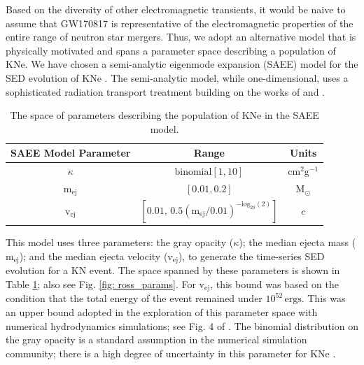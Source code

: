 Based on the diversity of other electromagnetic transients, it would be naive to assume that GW170817 is representative of the electromagnetic properties of the entire range of neutron star mergers. Thus, we adopt an alternative model that is physically motivated and spans a parameter space describing a population of KNe. We have chosen a semi-analytic eigenmode expansion (SAEE) model for the SED evolution of KNe \citep{Rosswog2018}. The semi-analytic model, while one-dimensional, uses a sophisticated radiation transport treatment building on the works of \citet{Wollaeger2017} and \citet{Pinto2000}.

\begin{table}[hb!]
  \centering
  \begin{tabular}{c|c|c}
    SAEE Model Parameter & Range & Units \\
    \hline
    $\kappa$ & $\mathrm{binomial}[1, 10]$ & $\mathrm{cm^2 g^{-1}}$ \\
    \hline
    $\mathrm{m_{ej}}$ & $[0.01, 0.2]$ & $\mathrm{M_{\odot}}$ \\
    \hline
    $\mathrm{v_{ej}}$ & $[0.01, \, 0.5 (\mathrm{m_{ej}}/0.01)^{-\mathrm{log}_{20}(2)}]$ & $c$
  \end{tabular}
  \caption{The space of parameters describing the population of KNe in the SAEE model.}
  \label{tab: ross_params}
\end{table}

This model uses three parameters: the gray opacity ($\kappa$); the median ejecta mass ($\mathrm{m_{ej}}$); and the median ejecta velocity ($\mathrm{v_{ej}}$), to generate the time-series SED evolution for a KN event. The space spanned by these parameters is shown in Table \ref{tab: ross_params}; also see Fig. \ref{fig: ross_params}. For $\mathrm{v_{ej}}$, this bound was based on the condition that the total energy of the event remained under $10^{52}\, \mathrm{ergs}$. This was an upper bound adopted in the exploration of this parameter space with numerical hydrodynamics simulations; see Fig. 4 of \citet{Rosswog2016a}. The binomial distribution on the gray opacity is a standard assumption in the numerical simulation community; there is a high degree of uncertainty in this parameter for KNe \citep{Rosswog2018, Kasen2013}.

